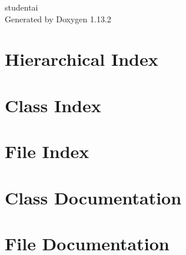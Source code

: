 \documentclass[twoside]{book}
\newcommand{\+}{\discretionary{\mbox{\scriptsize$\hookleftarrow$}}{}{}}
\newcommand{\clearemptydoublepage}{%
    \newpage{\pagestyle{empty}\cleardoublepage}%
  }
\begin{document}
  \raggedbottom
    \hypersetup{pageanchor=false,
                bookmarksnumbered=true,
                pdfencoding=unicode
               }
  \begin{titlepage}
  \vspace*{7cm}
  \begin{center}%
  {\Large studentai}\\
  \vspace*{1cm}
  {\large Generated by Doxygen 1.13.2}\\
  \end{center}
  \end{titlepage}
  \clearemptydoublepage
  \tableofcontents
  \clearemptydoublepage
  \hypersetup{pageanchor=true}
\chapter{Hierarchical Index}

\chapter{Class Index}

\chapter{File Index}

\chapter{Class Documentation}


\chapter{File Documentation}
















  \backmatter
  \newpage
  \clearemptydoublepage
  \printindex
\end{document}
